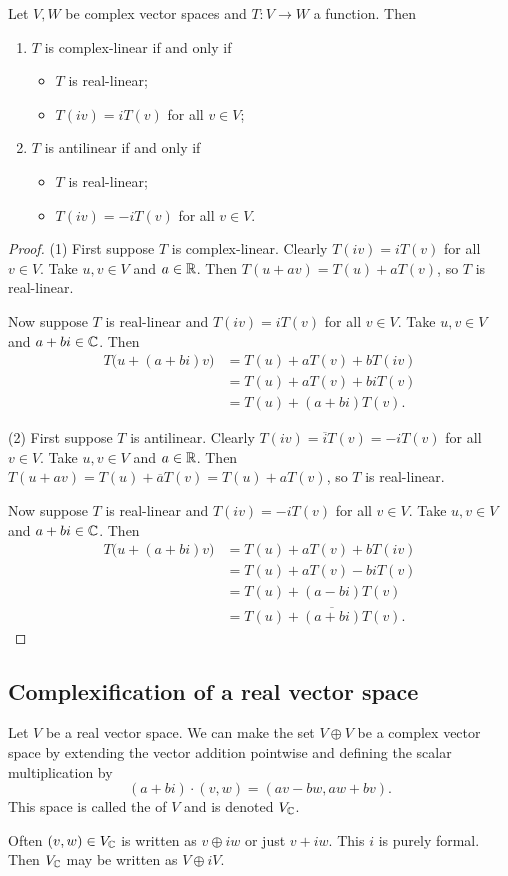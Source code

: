 \begin{lemma} \label{complexLinearAntilinearRealLinear}
Let $V,W$ be complex vector spaces and $T:V\to W$ a function. Then
\begin{enumerate}
\item $T$ is complex-linear \textup{if and only if}
\begin{itemize}
\item $T$ is real-linear;
\item $T(iv) = iT(v)$ for all $v\in V$;
\end{itemize}
\item $T$ is antilinear \textup{if and only if}
\begin{itemize}
\item $T$ is real-linear;
\item $T(iv) = -iT(v)$ for all $v\in V$.
\end{itemize}
\end{enumerate}
\end{lemma}
\begin{proof}
(1) First suppose $T$ is complex-linear. Clearly $T(iv) = iT(v)$ for all $v\in V$. Take $u,v\in V$ and $a\in \mathbb{R}$. Then $T(u+av) = T(u)+aT(v)$, so $T$ is real-linear.

Now suppose $T$ is real-linear and $T(iv) = iT(v)$ for all $v\in V$. Take $u,v\in V$ and $a+bi\in \mathbb{C}$. Then
\begin{align*}
T\big(u+ (a+bi)v\big) &= T(u) + aT(v) + bT(iv) \\
&= T(u) + aT(v) + biT(v) \\
&= T(u) + (a+bi)T(v). 
\end{align*}

(2) First suppose $T$ is antilinear. Clearly $T(iv) = \overline{i}T(v) = -iT(v)$ for all $v\in V$. Take $u,v\in V$ and $a\in \mathbb{R}$. Then $T(u+av) = T(u)+\overline{a}T(v) = T(u) + aT(v)$, so $T$ is real-linear.

Now suppose $T$ is real-linear and $T(iv) = -iT(v)$ for all $v\in V$. Take $u,v\in V$ and $a+bi\in \mathbb{C}$. Then
\begin{align*}
T\big(u+ (a+bi)v\big) &= T(u) + aT(v) + bT(iv) \\
&= T(u) + aT(v) - biT(v) \\
&= T(u) + (a - bi)T(v) \\
&= T(u) + \overline{(a+bi)}T(v). 
\end{align*}
\end{proof}

\subsection{Complexification of a real vector space}
\begin{definition}
Let $V$ be a real vector space. We can make the set $V\oplus V$ be a complex vector space by extending the vector addition pointwise and defining the scalar multiplication by
\[ (a+bi)\cdot(v,w) = (av-bw, aw+bv). \]
This space is called the  of $V$ and is denoted $V_{\mathbb{C}}$.
\end{definition}
Often $(v,w)\in V_{\mathbb{C}}$ is written as $v\oplus iw$ or just $v+iw$. This $i$ is purely formal. Then $V_{\mathbb{C}}$ may be written as $V\oplus iV$.

